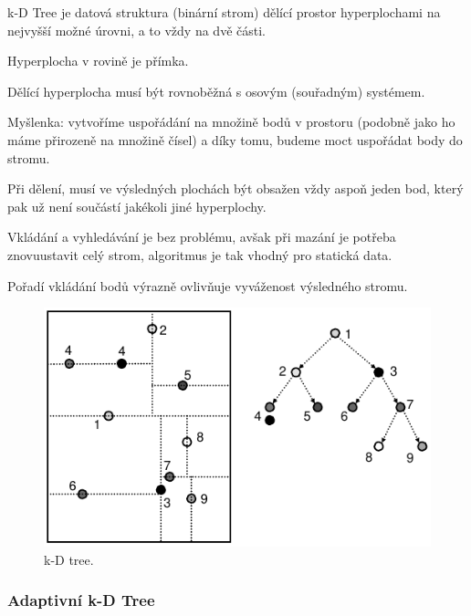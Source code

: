 \begin{compactitem}
    \item k-D Tree je datová struktura (binární strom) dělící prostor hyperplochami na nejvyšší možné úrovni, a to vždy na dvě části. \begin{compactitem}
        \item Hyperplocha v rovině je přímka.
        \item Dělící hyperplocha musí být rovnoběžná s osovým (souřadným) systémem.
    \end{compactitem}

    \item Myšlenka: vytvoříme uspořádání na množině bodů v prostoru (podobně jako ho máme přirozeně na množině čísel) a díky tomu, budeme moct uspořádat body do stromu.

    \item Při dělení, musí ve výsledných plochách být obsažen vždy aspoň jeden bod, který pak už není součástí jakékoli jiné hyperplochy.

    \item Vkládání a vyhledávání je bez problému, avšak při mazání je potřeba znovuustavit celý strom, algoritmus je tak vhodný pro statická data.

    \item Pořadí vkládání bodů výrazně ovlivňuje vyváženost výsledného stromu.
\end{compactitem}

\begin{figure}[H]
    \centering
    \includegraphics[width=0.75\linewidth]{kd_tree.pdf}
    \caption{k-D tree.}
\end{figure}

\subsubsection{Adaptivní k-D Tree}

